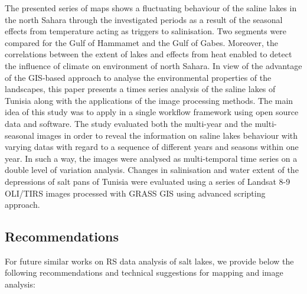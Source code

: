 \documentclass[environments,article,submit,pdftex,moreauthors]{Definitions/mdpi}
\begin{document}
The presented series of maps shows a fluctuating behaviour of the saline lakes in the north Sahara through the investigated periods as a result of the seasonal effects from temperature acting as triggers to salinisation. Two segments were compared for the Gulf of Hammamet and the Gulf of Gabes. Moreover, the correlations between the extent of lakes and effects from heat enabled to detect the influence of climate on environment of north Sahara. In view of the advantage of the GIS-based approach to analyse the environmental properties of the landscapes, this paper presents a times series analysis of the saline lakes of Tunisia along with the applications of the image processing methods. The main idea of this study was to apply in a single workflow framework using open source data and software. The study evaluated both the multi-year and the multi-seasonal images in order to reveal the information on saline lakes behaviour with varying datas with regard to a sequence of different years and seasons within one year. In such a way, the images were analysed as multi-temporal time series on a double level of variation analysis. Changes in salinisation and water extent of the depressions of salt pans of Tunisia were evaluated using a series of Landsat 8-9 OLI/TIRS images processed with GRASS GIS using advanced scripting approach. 

\subsection{Recommendations}

For future similar works on RS data analysis of salt lakes, we provide below the following recommendations and technical suggestions for mapping and image analysis:
\end{document}
